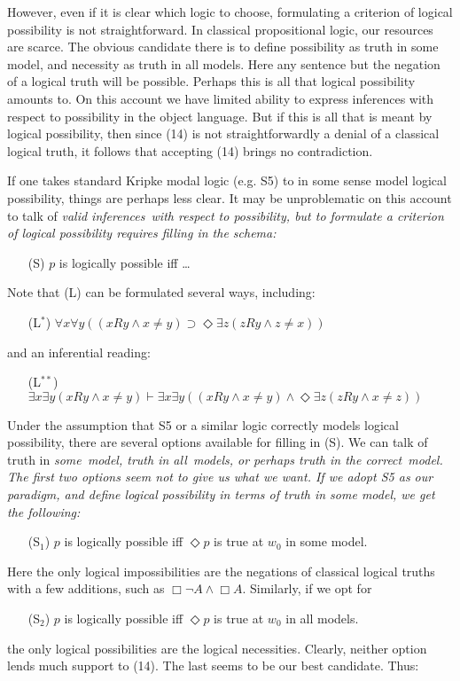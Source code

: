 However, even if it is clear which logic to choose, formulating a criterion of logical possibility is not straightforward. In classical propositional logic, our resources are scarce. The obvious candidate there is to define possibility as truth in some model, and necessity as truth in all models. Here any sentence but the negation of a logical truth will be possible. Perhaps this is all that logical possibility amounts to. On this account we have limited ability to express inferences with respect to possibility in the object language. But if this is all that is meant by logical possibility, then since (14) is not straightforwardly a denial of a classical logical truth, it follows that accepting (14) brings no contradiction.

If one takes standard Kripke modal logic (e.g. \textsf{S5}) to in some sense model logical possibility, things are perhaps less clear. It may be unproblematic on this account to talk of \em valid inferences\em\ with respect to possibility, but to formulate a criterion of logical possibility requires filling in the schema:

\begin{enumerate}
\item[(S)] $p$ is logically possible iff \dots
\end{enumerate}
Note that (L) can be formulated several ways, including:

\begin{enumerate}
\item[(L$^*$)]$\forall x\forall y((xRy\wedge x\neq y)\supset \Diamond\exists z(zRy\wedge z\neq x))$
\end{enumerate}
and an inferential reading:

\begin{enumerate}
\item[(L$^{**}$)]$\exists x\exists y(xRy\wedge x\neq y)\vdash\exists x\exists y((xRy\wedge x\neq y)\wedge\Diamond\exists z(zRy\wedge x\neq z))$
\end{enumerate}
Under the assumption that \textsf{S5} or a similar logic correctly models logical possibility, there are several options available for filling in (S). We can talk of truth in \em some\em\ model, truth in \em all\em\ models, or perhaps truth in \em the correct\em\ model. The first two options seem not to give us what we want. If we adopt \textsf{S5} as our paradigm, and define logical possibility in terms of truth in some model, we get the following:
\begin{enumerate}
\item[(S$_1$)] $p$ is logically possible iff $\Diamond p$ is true at $w_0$ in some model.
\end{enumerate}
Here the only logical impossibilities are the negations of classical logical truths with a few additions, such as $\Box\neg A\wedge\Box A$. Similarly, if we opt for
\begin{enumerate}
\item[(S$_2$)] $p$ is logically possible iff $\Diamond p$ is true at $w_0$ in all models.
\end{enumerate}
the only logical possibilities are the logical necessities. Clearly, neither option lends much support to (14). The last seems to be our best candidate. Thus:

